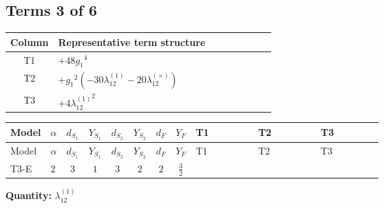 \documentclass[8pt]{article}
\begin{document}
\begin{landscape}
\subsection*{Terms 3 of 6}
\begin{center}
\begin{tabular}{@{}c >{\raggedright\arraybackslash}p{0.82\linewidth}@{}}
\toprule
Column & Representative term structure \\
\midrule
T1 & \(\displaystyle +48 {g_1}^4\) \\
\midrule
T2 & \(\displaystyle +{g_1}^2 (-30 {\lambda_{12}^{(1)}}-20 {\lambda_{12}^{(\times)}})\) \\
\midrule
T3 & \(\displaystyle +4 {\lambda_{12}^{(1)}}^2\) \\
\midrule
\bottomrule
\end{tabular}
\end{center}
\smallskip
\tiny
\begin{longtable}{@{}llcccccc >{\raggedright\arraybackslash}p{0.21\linewidth} >{\raggedright\arraybackslash}p{0.21\linewidth} >{\raggedright\arraybackslash}p{0.21\linewidth}@{}}
\toprule
Model & $\alpha$ & $d_{S_1}$ & $Y_{S_1}$ & $d_{S_2}$ & $Y_{S_2}$ & $d_F$ & $Y_F$ & T1 & T2 & T3 \\
\midrule
\endfirsthead
\toprule
Model & $\alpha$ & $d_{S_1}$ & $Y_{S_1}$ & $d_{S_2}$ & $Y_{S_2}$ & $d_F$ & $Y_F$ & T1 & T2 & T3 \\
\midrule
\endhead
T3-E & $2$ & $3$ & $1$ & $3$ & $2$ & $2$ & $\frac{3}{2}$ & \scriptsize\adjustbox{max width=\linewidth}{$\begin{gathered} +48 {g_1}^4\end{gathered}$} & \scriptsize\adjustbox{max width=\linewidth}{$\begin{gathered} +{g_1}^2 (-30 {\lambda_{12}^{(1)}}-20 {\lambda_{12}^{(\times)}})\end{gathered}$} & \scriptsize\adjustbox{max width=\linewidth}{$\begin{gathered} +4 {\lambda_{12}^{(1)}}^2\end{gathered}$} \\
\midrule
\bottomrule
\end{longtable}
\clearpage
\noindent\textbf{Quantity: }$\lambda_{12}^{(1)}$\par\smallskip

\end{landscape}
\end{document}

